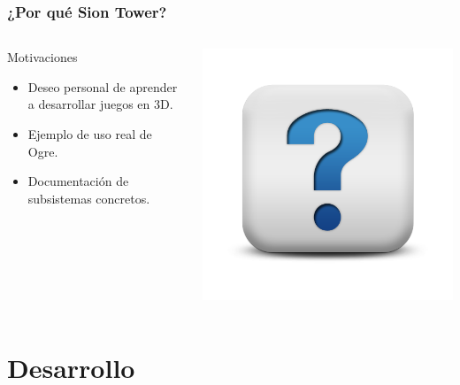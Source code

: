 \documentclass[green]{beamer}
\begin{document}
\begin{frame}
\transdissolve
    \frametitle{¿Por qué Sion Tower?}
        
    \begin{columns}[c]
    \column{200pt}
        
	\begin{block}{Motivaciones}
            \begin{itemize}
                \item Deseo personal de aprender a desarrollar juegos en 3D.
		\item Ejemplo de uso real de Ogre.
		\item Documentación de subsistemas concretos.
            \end{itemize}            
        \end{block}

    \column{100pt}
        
	\begin{center}
	    \includegraphics[scale=0.2]{img/question.png}
	\end{center}
    \end{columns} 
\end{frame}

\section{Desarrollo}
\end{document}
